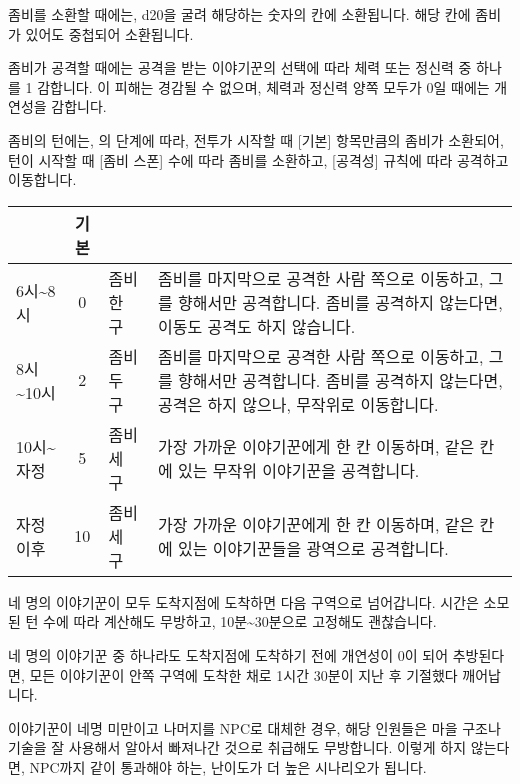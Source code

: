 \documentclass{report}
\begin{document}
		좀비를 소환할 때에는, d20을 굴려 해당하는 숫자의 칸에 소환됩니다. 해당 칸에 좀비가 있어도 중첩되어 소환됩니다.
		
		좀비가 공격할 때에는 공격을 받는 이야기꾼의 선택에 따라 체력 또는 정신력 중 하나를 1 감합니다. 이 피해는 경감될 수 없으며, 체력과 정신력 양쪽 모두가 0일 때에는 개연성을 감합니다.
		
		좀비의 턴에는, 의 단계에 따라, 전투가 시작할 때 [기본] 항목만큼의 좀비가 소환되어, 턴이 시작할 때 [좀비 스폰] 수에 따라 좀비를 소환하고, [공격성] 규칙에 따라 공격하고 이동합니다.
		
		\begin{tabularx}{\linewidth}{l|c|l|X}
			\makecell{\centering\textbf{시간}} & \textbf{기본} & \makecell{\centering\textbf{좀비 스폰}} & \makecell{\centering\textbf{공격성}}\\\hline\hline
			6시\textasciitilde8시 & 0 & 좀비 한 구 & 좀비를 마지막으로 공격한 사람 쪽으로 이동하고, 그를 향해서만 공격합니다. 좀비를 공격하지 않는다면, 이동도 공격도 하지 않습니다. \\\hline
			8시\textasciitilde10시 & 2 & 좀비 두 구 & 좀비를 마지막으로 공격한 사람 쪽으로 이동하고, 그를 향해서만 공격합니다. 좀비를 공격하지 않는다면, 공격은 하지 않으나, 무작위로 이동합니다. \\\hline
			10시\textasciitilde 자정 & 5 & 좀비 세 구 & 가장 가까운 이야기꾼에게 한 칸 이동하며, 같은 칸에 있는 무작위 이야기꾼을 공격합니다. \\\hline
			자정 이후 & 10 & 좀비 세 구 & 가장 가까운 이야기꾼에게 한 칸 이동하며, 같은 칸에 있는 이야기꾼들을 광역으로 공격합니다.
		\end{tabularx}
		
		네 명의 이야기꾼이 모두 도착지점에 도착하면 다음 구역으로 넘어갑니다. 시간은 소모된 턴 수에 따라 계산해도 무방하고, 10분\textasciitilde30분으로 고정해도 괜찮습니다.
		
		네 명의 이야기꾼 중 하나라도 도착지점에 도착하기 전에 개연성이 0이 되어 추방된다면, 모든 이야기꾼이 안쪽 구역에 도착한 채로 1시간 30분이 지난 후 기절했다 깨어납니다.
		
		이야기꾼이 네명 미만이고 나머지를 NPC로 대체한 경우, 해당 인원들은 마을 구조나 기술을 잘 사용해서 알아서 빠져나간 것으로 취급해도 무방합니다. 이렇게 하지 않는다면, NPC까지 같이 통과해야 하는, 난이도가 더 높은 시나리오가 됩니다.
	
\end{document}
